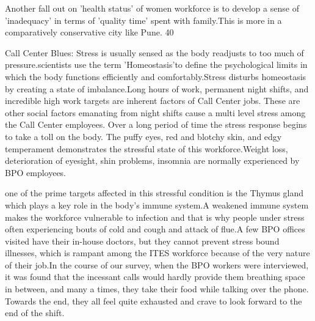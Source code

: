 Another fall out on 'health status' of women workforce is to develop a sense of 'inadequacy' in terms of 'quality time' spent with family.This is more in a comparatively conservative city like Pune. 40%

Call Center Blues:
Stress is usually sensed as the body readjusts to too much of pressure.scientists use the term 'Homeostasis'to define the psychological limits in which the body functions efficiently and comfortably.Stress disturbs homeostasis by creating a state of imbalance.Long hours of work, permanent night shifts, and incredible high work targets are inherent factors of Call Center jobs. These are other social factors emanating from night shifts cause a multi level stress among the Call Center employees. Over a long period of time the stress response begins to take a toll on the body. The puffy eyes, red and blotchy skin, and edgy temperament demonstrates the stressful state of this workforce.Weight loss, deterioration of eyesight, shin problems, insomnia are normally experienced by BPO employees.

one of the prime targets affected in this stressful condition is the Thymus gland which plays a key role in the body's immune system.A weakened immune system makes the workforce vulnerable to infection and that is why people under stress often experiencing bouts of cold and cough and attack of flue.A few BPO offices visited have their in-house doctors, but they cannot prevent stress bound illnesses, which is rampant among the ITES workforce because of the very nature of their job.In the course of our survey, when the BPO workers were interviewed, it was found that the incessant calls would hardly provide them breathing space in between, and  many a times, they take their food while talking over the phone. Towards the end, they all feel quite exhausted and crave to look forward to the end of the shift.

